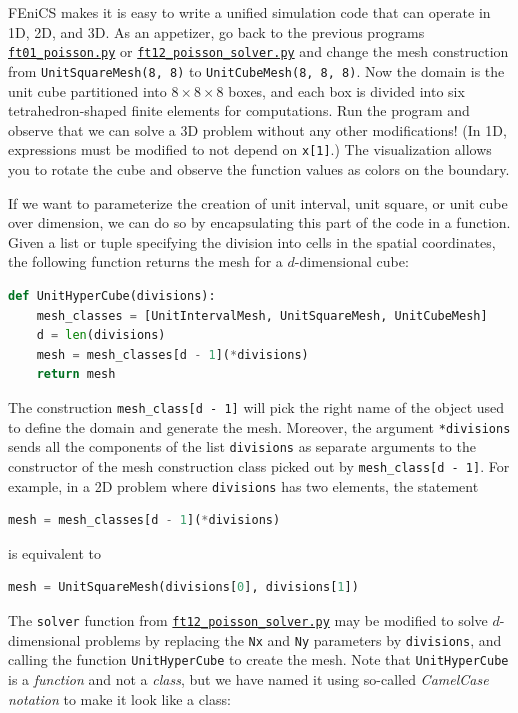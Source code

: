 \documentclass[graybox,envcountchap,sectrefs,final]{svmonodo}
\begin{document}
FEniCS makes it is easy to write a unified simulation code that can
operate in 1D, 2D, and 3D. As an appetizer, go back to the
previous programs
\href{{https://fenicsproject.org/pub/tutorial/python/vol1/ft01_poisson.py}}{\nolinkurl{ft01_poisson.py}}
or
\href{{https://fenicsproject.org/pub/tutorial/python/vol1/ft12_poisson_solver.py}}{\nolinkurl{ft12_poisson_solver.py}}
and change the mesh construction from \texttt{UnitSquareMesh(8, 8)} to
\texttt{UnitCubeMesh(8, 8, 8)}. Now the domain is the unit cube
partitioned into $8\times 8\times 8$ boxes, and each box
is divided into six tetrahedron-shaped finite elements for
computations. Run the program and observe that we can solve a 3D
problem without any other modifications! (In 1D, expressions must be
modified to not depend on \texttt{x[1]}.) The visualization allows you to
rotate the cube and observe the function values as colors on the
boundary.

If we want to parameterize the creation of unit interval, unit square,
or unit cube over dimension, we can do so by encapsulating this part
of the code in a function. Given a list or tuple specifying the division
into cells in the spatial coordinates, the following function
returns the mesh for a $d$-dimensional cube:

\begin{lstlisting}[language=Python,style=graycolor]
def UnitHyperCube(divisions):
    mesh_classes = [UnitIntervalMesh, UnitSquareMesh, UnitCubeMesh]
    d = len(divisions)
    mesh = mesh_classes[d - 1](*divisions)
    return mesh
\end{lstlisting}
The construction \Verb!mesh_class[d - 1]! will pick the right name of the
object used to define the domain and generate the mesh.  Moreover, the
argument \texttt{*divisions} sends all the components of the list \texttt{divisions}
as separate arguments to the constructor of the mesh construction
class picked out by \Verb!mesh_class[d - 1]!. For example, in a 2D problem
where \texttt{divisions} has two elements, the statement

\begin{lstlisting}[language=Python,style=graycolor]
mesh = mesh_classes[d - 1](*divisions)
\end{lstlisting}
is equivalent to

\begin{lstlisting}[language=Python,style=graycolor]
mesh = UnitSquareMesh(divisions[0], divisions[1])
\end{lstlisting}

The \texttt{solver} function from
\href{{https://fenicsproject.org/pub/tutorial/python/vol1/ft12_poisson_solver.py}}{\nolinkurl{ft12_poisson_solver.py}}
may be modified to solve $d$-dimensional problems by replacing the
\texttt{Nx} and \texttt{Ny} parameters by \texttt{divisions}, and calling the function
\texttt{UnitHyperCube} to create the mesh. Note that \texttt{UnitHyperCube} is a
\emph{function} and not a \emph{class}, but we have named it using so-called
\emph{CamelCase notation} to make it look like a class:
\end{document}
